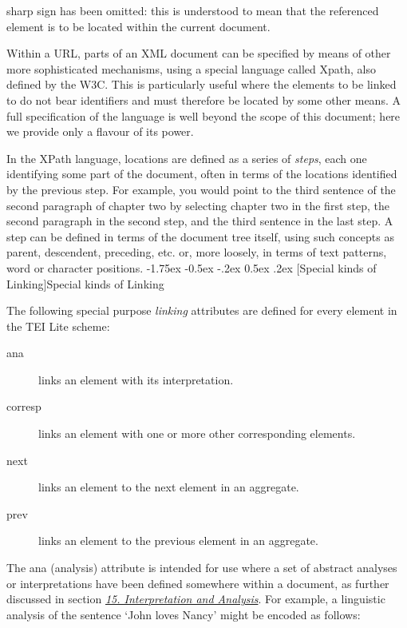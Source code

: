 \documentclass[11pt,twoside]{article}\makeatletter
\makeatletter
\renewcommand\section{\@startsection {section}{1}{\z@}%
     {-1.75ex \@plus -0.5ex \@minus -.2ex}%
     {0.5ex \@plus .2ex}%
     {\reset@font\Large\bfseries\sffamily}}
\renewcommand\subsection{\@startsection{subsection}{2}{\z@}%
     {-1.75ex\@plus -0.5ex \@minus- .2ex}%
     {0.5ex \@plus .2ex}%
     {\reset@font\Large\sffamily}}
\def\DivII{\subsection}
\def\DivII{\section}
\makeatother
\begin{document}
sharp sign has been omitted: this is understood to mean that the
referenced element is to be located within the current document.\par Within a URL, parts of an XML document can be specified by means of
other more sophisticated mechanisms, using a special language called
Xpath, also defined by the W3C.  This is particularly useful where the
elements to be linked to do not bear identifiers and must therefore be
located by some other means.  A full specification of the language is
well beyond the scope of this document; here we provide only a flavour
of its power. \par In the XPath language, locations are defined as a series of
\emph{steps}, each one identifying some part of the document,
often in terms of the locations identified by the previous step.  For
example, you would point to the third sentence of the second paragraph
of chapter two by selecting chapter two in the first step, the second
paragraph in the second step, and the third sentence in the last step.
A step can be defined in terms of the document tree itself, using such
concepts as parent, descendent,
preceding, etc. or, more loosely, in terms of text
patterns, word or character positions. 
\DivII[Special kinds of Linking]{Special kinds of Linking}\label{xatts}\par The following special purpose \emph{linking} attributes are
defined for every element in the TEI Lite scheme:
\begin{description}

\item[ana]links an element with its interpretation.
\item[corresp]links an element with one or more other corresponding elements.
\item[next]links an element to the next element in an aggregate.
\item[prev]links an element to the previous element in an aggregate.
\end{description} \par The ana (analysis) attribute is intended for use
where a set of abstract analyses or interpretations have been defined
somewhere within a document, as further discussed in section
\textit{\hyperref[U5-anal]{15. Interpretation and  Analysis}}. For example, a linguistic analysis of the sentence
‘John loves Nancy’ might be encoded as follows:
\end{document}
